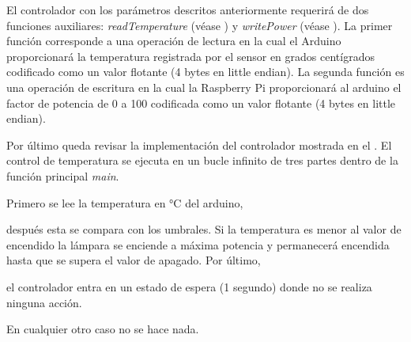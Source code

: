 El controlador con los parámetros descritos anteriormente requerirá de dos funciones auxiliares: \emph{readTemperature} (véase ) y \emph{writePower} (véase ).
La primer función corresponde a una operación de lectura en la cual el Arduino proporcionará la temperatura registrada por el sensor en grados centígrados codificado como un valor flotante (4 bytes en little endian).
La segunda función es una operación de escritura en la cual la Raspberry Pi proporcionará al arduino el factor de potencia de 0 a 100 codificada como un valor flotante (4 bytes en little endian).

\begin{minipage}{\linewidth}%

\end{minipage}

\begin{minipage}{\linewidth}%

\end{minipage}

Por último queda revisar la implementación del controlador mostrada en el .
El control de temperatura se ejecuta en un bucle infinito de tres partes dentro de la función principal \emph{main}.
\begin{enumerate*}[label=\arabic*\rpar]
	\item Primero se lee la temperatura en °C del arduino,
	\item después esta se compara con los umbrales.
	Si la temperatura es menor al valor de encendido la lámpara se enciende a máxima potencia y permanecerá encendida hasta que se supera el valor de apagado.
	Por último,
	\item el controlador entra en un estado de espera (1 segundo) donde no se realiza ninguna acción.
\end{enumerate*}
En cualquier otro caso no se hace nada.

\begin{minipage}{\linewidth}%

\end{minipage}